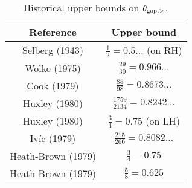 \begin{table}[ht]
    \caption{Historical upper bounds on $\theta_{\mathrm{gap},>}$.}
    \centering
    \renewcommand{\arraystretch}{1.2}
    \begin{tabular}{|c|c|}
    \hline
    Reference & Upper bound \\
    \hline
    Selberg (1943) \cite{selberg_1943} & $\frac{1}{2}=0.5\dots$ (on RH)\\
    \hline
    Wolke (1975) \cite{wolke_1975} & $\frac{29}{30} = 0.966\dots$ \\
    \hline
    Cook (1979) \cite{cook_1979} & $\frac{85}{98} = 0.8673\dots$ \\
    \hline
    Huxley (1980) \cite{huxley_large_1980} & $\frac{1759}{2134} = 0.8242\dots$ \\
    \hline
    Huxley (1980) \cite{huxley_large_1980} & $\frac{3}{4} = 0.75$ (on LH) \\
    \hline
    Iv\'ic (1979) & $\frac{215}{266} = 0.8082\dots$ \\
    \hline
    Heath-Brown (1979) \cite{heath_brown_consecutive_III} & $\frac{3}{4} = 0.75$ \\
    \hline
    Heath-Brown (1979) \cite{heath_brown_consecutive_II} & $\frac{5}{8} = 0.625$ \\
    \end{tabular}
    \end{table}\label{gaplarge-table}

